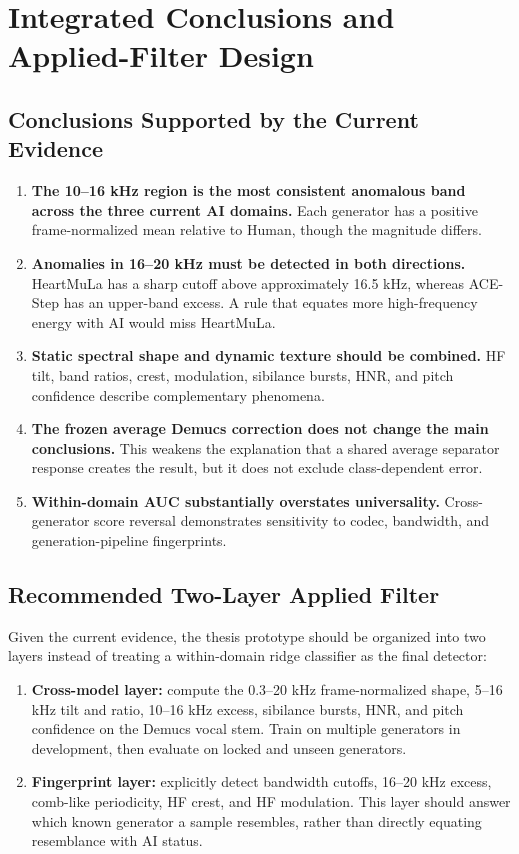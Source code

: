 \documentclass[11pt,a4paper]{article}
\begin{document}
\section{Integrated Conclusions and Applied-Filter Design}
\label{sec:conclusion}

\subsection{Conclusions Supported by the Current Evidence}

\begin{enumerate}
  \item \textbf{The 10--16 kHz region is the most consistent anomalous band across the three current AI domains.} Each generator has a positive frame-normalized mean relative to Human, though the magnitude differs.
  \item \textbf{Anomalies in 16--20 kHz must be detected in both directions.} HeartMuLa has a sharp cutoff above approximately 16.5 kHz, whereas ACE-Step has an upper-band excess. A rule that equates more high-frequency energy with AI would miss HeartMuLa.
  \item \textbf{Static spectral shape and dynamic texture should be combined.} HF tilt, band ratios, crest, modulation, sibilance bursts, HNR, and pitch confidence describe complementary phenomena.
  \item \textbf{The frozen average Demucs correction does not change the main conclusions.} This weakens the explanation that a shared average separator response creates the result, but it does not exclude class-dependent error.
  \item \textbf{Within-domain AUC substantially overstates universality.} Cross-generator score reversal demonstrates sensitivity to codec, bandwidth, and generation-pipeline fingerprints.
\end{enumerate}

\subsection{Recommended Two-Layer Applied Filter}

Given the current evidence, the thesis prototype should be organized into two layers instead of treating a within-domain ridge classifier as the final detector:

\begin{enumerate}
  \item \textbf{Cross-model layer:} compute the 0.3--20 kHz frame-normalized shape, 5--16 kHz tilt and ratio, 10--16 kHz excess, sibilance bursts, HNR, and pitch confidence on the Demucs vocal stem. Train on multiple generators in development, then evaluate on locked and unseen generators.
  \item \textbf{Fingerprint layer:} explicitly detect bandwidth cutoffs, 16--20 kHz excess, comb-like periodicity, HF crest, and HF modulation. This layer should answer which known generator a sample resembles, rather than directly equating resemblance with AI status.
\end{enumerate}
\end{document}
